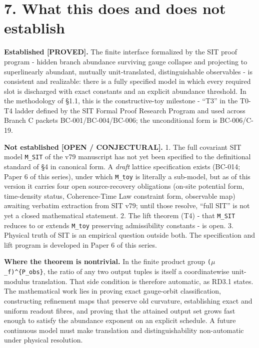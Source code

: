\documentclass[
  american,
  11pt,
  letterpaper,
]{article}
\begin{document}
\section{7. What this does and does not establish}\label{what-this-does-and-does-not-establish}

\textbf{Established {[}PROVED{]}.} The finite interface formalized by the SIT proof program - hidden branch abundance surviving gauge collapse and projecting to superlinearly abundant, mutually unit-translated, distinguishable observables - is consistent and realizable: there is a fully specified model in which every required slot is discharged with exact constants and an explicit abundance threshold. In the methodology of §1.1, this is the constructive-toy milestone - ``T3'' in the T0-T4 ladder defined by the SIT Formal Proof Research Program and used across Branch C packets BC-001/BC-004/BC-006; the unconditional form is BC-006/C-19.

\textbf{Not established {[}OPEN / CONJECTURAL{]}.} 1. The full covariant SIT model \texttt{M\_SIT} of the v79 manuscript has not yet been specified to the definitional standard of §4 in canonical form. A \emph{draft} lattice specification exists (BC-014; Paper 6 of this series), under which \texttt{M\_toy} is literally a sub-model, but as of this version it carries four open source-recovery obligations (on-site potential form, time-density status, Coherence-Time Law constraint form, observable map) awaiting verbatim extraction from SIT v79; until those resolve, ``full SIT'' is not yet a closed mathematical statement. 2. The lift theorem (T4) - that \texttt{M\_SIT} reduces to or extends \texttt{M\_toy} preserving admissibility constants - is open. 3. Physical truth of SIT is an empirical question outside both. The specification and lift program is developed in Paper 6 of this series.

\textbf{Where the theorem is nontrivial.} In the finite product group \texttt{(\ensuremath{\mu}\_f)\^{}\{P\_obs\}}, the ratio of any two output tuples is itself a coordinatewise unit-modulus translation. That side condition is therefore automatic, as RD3.1 states. The mathematical work lies in proving exact gauge-orbit classification, constructing refinement maps that preserve old curvature, establishing exact and uniform readout fibres, and proving that the attained output set grows fast enough to satisfy the abundance exponent on an explicit schedule. A future continuous model must make translation and distinguishability non-automatic under physical resolution.
\end{document}
